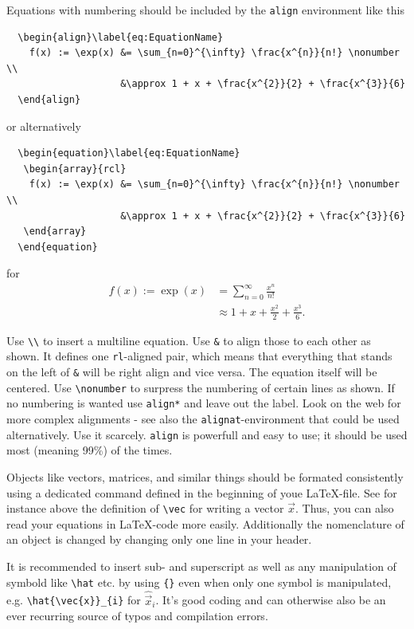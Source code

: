 \documentclass[../main.tex]{subfiles}
\begin{document}
Equations with numbering should be included by the \verb!align! environment
like this
\begin{verbatim}
  \begin{align}\label{eq:EquationName}
    f(x) := \exp(x) &= \sum_{n=0}^{\infty} \frac{x^{n}}{n!} \nonumber \\
                    &\approx 1 + x + \frac{x^{2}}{2} + \frac{x^{3}}{6}
  \end{align}
\end{verbatim}
  or alternatively
\begin{verbatim}
  \begin{equation}\label{eq:EquationName}
   \begin{array}{rcl}
    f(x) := \exp(x) &= \sum_{n=0}^{\infty} \frac{x^{n}}{n!} \nonumber \\
                    &\approx 1 + x + \frac{x^{2}}{2} + \frac{x^{3}}{6}
   \end{array}
  \end{equation}
\end{verbatim}
for
~
\begin{align}\label{eq:EquationName}
  f(x) := \exp(x) &= \sum_{n=0}^{\infty} \frac{x^{n}}{n!} \nonumber \\
                  &\approx 1 + x + \frac{x^{2}}{2} + \frac{x^{3}}{6}.
\end{align}

Use \verb!\\! to insert a multiline equation. Use \verb!&! to align those 
to each other as shown. It defines one \verb!rl!-aligned pair, which means that
everything that stands on the left of \verb!&! will be right align and vice
versa.  The equation itself will be centered. Use \verb!\nonumber! to surpress
the numbering of certain lines as shown. If no numbering is wanted use
\verb!align*! and leave out the label. Look on the web for more complex
alignments - see also the \verb!alignat!-environment that could be used
alternatively. Use it scarcely. \verb!align! is powerfull and easy to use; it
should be used most (meaning 99\%) of the times.

Objects like vectors, matrices, and similar things should be formated
consistently using a dedicated command defined in the beginning of youe
\LaTeX-file. See for instance above the definition of \verb!\vec! for writing
a vector $\vec{x}$. Thus, you can also read your equations in \LaTeX-code more
easily. Additionally the nomenclature of an object is changed by
changing only one line in your header. 

It is recommended to insert sub- and superscript as well as any manipulation of
symbold like \verb!\hat! etc. by using \verb!{}! even when only one symbol is
manipulated, e.g. \verb!\hat{\vec{x}}_{i}! for $\hat{\vec{x}}_{i}$. It's good
coding and can otherwise also be an ever recurring source of typos and
compilation errors.
\end{document}
